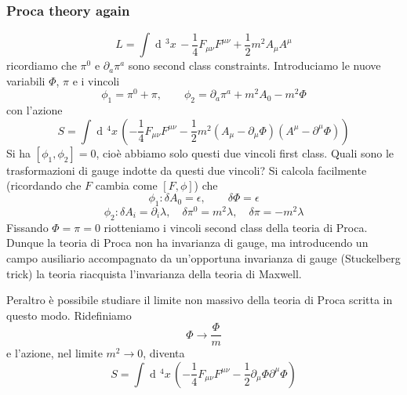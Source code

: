\documentclass[a4paper, 11pt]{article}
\newcommand{\dd}{\mathop{\mathrm{d}\!}{}}
\begin{document}
	\subsubsection{Proca theory again}
	\[ L = \int \dd^3 x\, -\dfrac{1}{4} F_{\mu\nu}F^{\mu\nu} + \dfrac{1}{2} m^2 A_\mu A^\mu \]
	ricordiamo che $\pi^0$ e $\partial_a \pi^a$ sono second class constraints. Introduciamo le nuove variabili $\Phi$, $\pi$ e i vincoli
	\[ \phi_1 = \pi^0 + \pi,\qquad \phi_2 = \partial_a \pi^a + m^2 A_0 - m^2 \Phi \]
	con l'azione
	\[ S = \int \dd^4 x\, \left( -\dfrac{1}{4} F_{\mu\nu} F^{\mu\nu} - \dfrac{1}{2} m^2 (A_\mu - \partial_\mu \Phi)(A^\mu - \partial^\mu \Phi) \right) \]
	Si ha $[\phi_1, \phi_2] = 0$, cioè abbiamo solo questi due vincoli first class. Quali sono le trasformazioni di gauge indotte da questi due vincoli? Si calcola facilmente (ricordando che $F$ cambia come $[F, \phi]$) che
	\[ \phi_1: \delta A_0 = \epsilon,\qquad \delta \Phi = \epsilon \]
	\[ \phi_2: \delta A_i = \partial_i\lambda,\quad \delta \pi^0 = m^2\lambda,\quad 
	\delta \pi = -m^2 \lambda \]
	Fissando $\Phi=\pi = 0$ riotteniamo i vincoli second class della teoria di Proca. Dunque la teoria di Proca non ha invarianza di gauge, ma introducendo un campo ausiliario accompagnato da un'opportuna invarianza di gauge (Stuckelberg trick) la teoria riacquista l'invarianza della teoria di Maxwell.
	
	Peraltro è possibile studiare il limite non massivo della teoria di Proca scritta in questo modo. Ridefiniamo
	\[ \Phi \rightarrow \dfrac{\Phi}{m} \]
	e l'azione, nel limite $m^2\rightarrow 0$, diventa
	\[ S = \int \dd^4 x\, \left( -\dfrac{1}{4} F_{\mu\nu} F^{\mu\nu} - \dfrac{1}{2} \partial_\mu \Phi \partial^\mu \Phi \right) \]
	
	
	
	
	
	
	\newpage
	
\end{document}
